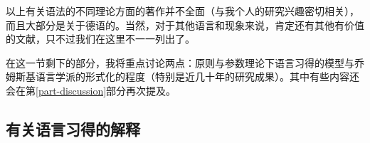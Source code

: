 以上有关语法的不同理论方面的著作并不全面（与我个人的研究兴趣密切相关），而且大部分是关于德语的。当然，对于其他语言和现象来说，肯定还有其他有价值的文献，只不过我们在这里不一一列出了。

在这一节剩下的部分，我将重点讨论两点：原则与参数理论下语言习得的模型与乔姆斯基语言学派的形式化的程度（特别是近几十年的研究成果）。其中有些内容还会在第\ref{part-discussion}部分再次提及。

\subsection{有关语言习得的解释}
\label{sec-acquisition-gb}

